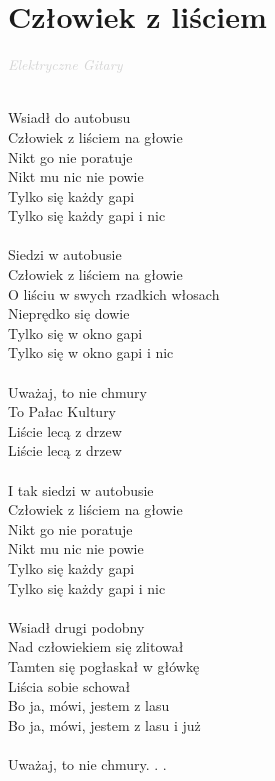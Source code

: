 \documentclass[a5paper, 10pt]{book}
\begin{document}
\section{Człowiek z liściem}\textcolor{lightgray}{\textit{Elektryczne Gitary}}\\~\\
\begin{minipage}[t]{0.5\textwidth}
Wsiadł do autobusu\\
Człowiek z liściem na głowie\\
Nikt go nie poratuje\\
Nikt mu nic nie powie\\
Tylko się każdy gapi\\
Tylko się każdy gapi i nic\\
\\
Siedzi w autobusie\\
Człowiek z liściem na głowie\\
O liściu w swych rzadkich włosach\\
Nieprędko się dowie\\
Tylko się w okno gapi\\
Tylko się w okno gapi i nic\\
\\
\hspace*{5mm}Uważaj, to nie chmury\\
\hspace*{5mm}To Pałac Kultury\\
\hspace*{5mm}Liście lecą z drzew\\
\hspace*{5mm}Liście lecą z drzew\\
\\
I tak siedzi w autobusie\\
Człowiek z liściem na głowie\\
Nikt go nie poratuje\\
Nikt mu nic nie powie\\
Tylko się każdy gapi\\
Tylko się każdy gapi i nic\\
\\
Wsiadł drugi podobny\\
Nad człowiekiem się zlitował\\
Tamten się pogłaskał w główkę\\
Liścia sobie schował\\
Bo ja, mówi, jestem z lasu\\
Bo ja, mówi, jestem z lasu i już\\
\\
\hspace*{5mm}Uważaj, to nie chmury. . .\\
\end{minipage}
\end{document}
